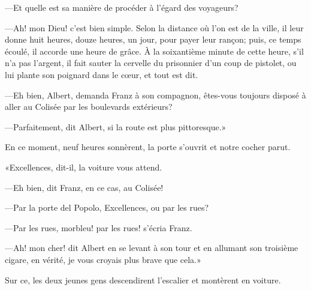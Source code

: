 —Et quelle est sa manière de procéder à l'égard des voyageurs? 

—Ah! mon Dieu! c'est bien simple. Selon la distance où l'on est de la ville, il leur donne huit heures, douze heures, un jour, pour payer leur rançon; puis, ce temps écoulé, il accorde une heure de grâce. À la soixantième minute de cette heure, s'il n'a pas l'argent, il fait sauter la cervelle du prisonnier d'un coup de pistolet, ou lui plante son poignard dans le cœur, et tout est dit. 

—Eh bien, Albert, demanda Franz à son compagnon, êtes-vous toujours disposé à aller au Colisée par les boulevards extérieurs? 

—Parfaitement, dit Albert, si la route est plus pittoresque.» 

En ce moment, neuf heures sonnèrent, la porte s'ouvrit et notre cocher parut. 

«Excellences, dit-il, la voiture vous attend. 

—Eh bien, dit Franz, en ce cas, au Colisée! 

—Par la porte del Popolo, Excellences, ou par les rues? 

—Par les rues, morbleu! par les rues! s'écria Franz.  

—Ah! mon cher! dit Albert en se levant à son tour et en allumant son troisième cigare, en vérité, je vous croyais plus brave que cela.» 

Sur ce, les deux jeunes gens descendirent l'escalier et montèrent en voiture. 